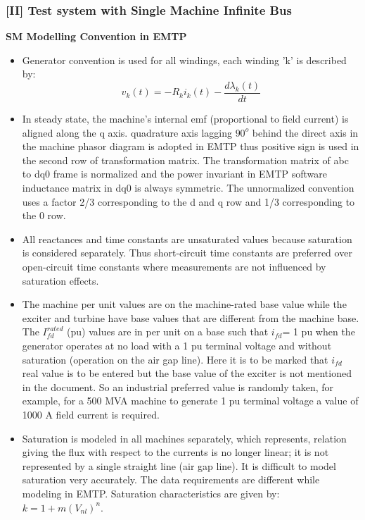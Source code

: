 \documentclass{report}
\begin{document}
\subsubsection{[II] Test system with Single Machine Infinite Bus}
\textbf{SM Modelling Convention in EMTP} 
\begin{itemize}
    \item Generator convention is used for all windings, each winding 'k' is described by:
    \begin{equation}
        v_k(t)=-R_ki_k(t) - \frac{d\lambda_k(t)}{dt}
    \end{equation}
    \item In steady state, the machine's internal emf (proportional to field current) is aligned along the q axis. quadrature axis lagging $90^o$ behind the direct axis in the machine phasor diagram is adopted in EMTP thus positive sign is used in the second row of transformation matrix. The transformation matrix of abc to dq0 frame is normalized and the power invariant in EMTP software inductance matrix in dq0 is always symmetric. The unnormalized convention uses a factor 2/3 corresponding to the d and q row and 1/3 corresponding to the 0 row.
    \item All reactances and time constants are unsaturated values because saturation is considered separately. Thus short-circuit time constants are preferred over open-circuit time constants where measurements are not influenced by saturation effects.
    \item The machine per unit values are on the machine-rated base value while the exciter and turbine have base values that are different from the machine base. The $I_{fd}^{rated}$ (pu)  values are in per unit on a base such that $i_{fd}$= 1 pu when the generator operates at no load with a 1 pu terminal voltage and without saturation (operation on the air gap line). Here it is to be marked that $i_{fd}$ real value is to be entered but the base value of the exciter is not mentioned in the document. So an industrial preferred value is randomly taken, for example, for a 500 MVA machine to generate 1 pu terminal voltage a value of 1000 A field current is required. 
    \item Saturation is modeled in all machines separately, which represents, relation giving the flux with respect to the currents is no longer linear; it is not represented by a single straight line (air gap line). It is difficult to model saturation very accurately. The data requirements are different while modeling in EMTP. Saturation characteristics are given by: $k=1 + m(V_{nl})^n$. 

\end{itemize}
\end{document}
